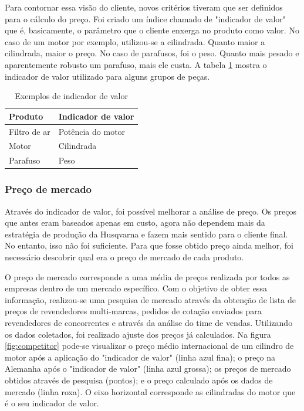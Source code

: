\documentclass[12pt]{article}
\begin{document}
	Para contornar essa visão do cliente, novos critérios tiveram que ser definidos para o cálculo do preço. Foi criado um índice chamado de "indicador de valor" que é, basicamente, o parâmetro que o cliente enxerga no produto como valor. No caso de um motor por exemplo, utilizou-se a cilindrada. Quanto maior a cilindrada, maior o preço. No caso de parafusos, foi o peso. Quanto mais pesado e aparentemente robusto um parafuso, mais ele custa. A tabela \ref{tab:valor} mostra o indicador de valor utilizado para alguns grupos de peças.

\begin{table}[!h]
	\centering
	\caption{Exemplos de indicador de valor}
	\begin{tabular}{| l | l |}
		\hline
		Produto & Indicador de valor \\ \hline
		Filtro de ar & Potência do motor \\
		Motor & Cilindrada \\
		Parafuso & Peso \\
		\hline
	\end{tabular}
	\label{tab:valor}
\end{table}

\subsubsection{Preço de mercado}

	Através do indicador de valor, foi possível melhorar a análise de preço. Os preços que antes eram baseados apenas em custo, agora não dependem mais da estratégia de produção da Husqvarna e fazem mais sentido para o cliente final. No entanto, isso não foi suficiente. Para que fosse obtido preço ainda melhor, foi necessário descobrir qual era o preço de mercado de cada produto.

	O preço de mercado corresponde a uma média de preços realizada por todos as empresas dentro de um mercado específico. Com o objetivo de obter essa informação, realizou-se uma pesquisa de mercado através da obtenção de lista de preços de revendedores multi-marcas, pedidos de cotação enviados para revendedores de concorrentes e através da análise do time de vendas. Utilizando os dados coletados, foi realizado ajuste dos preços já calculados. Na figura \ref{fig:competitor} pode-se visualizar o preço médio internacional de um cilindro de motor após a aplicação do "indicador de valor" (linha azul fina); o preço na Alemanha após o "indicador de valor" (linha azul grossa); os preços de mercado obtidos através de pesquisa (pontos); e o preço calculado após os dados de mercado (linha roxa). O eixo horizontal corresponde as cilindradas do motor que é o seu indicador de valor.
\end{document}
